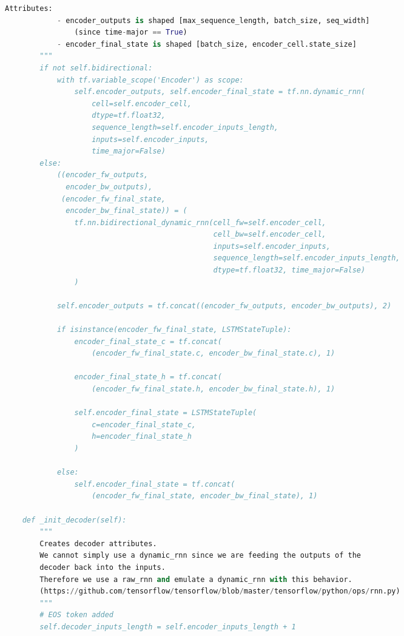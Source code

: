 \begin{landscape}
\begin{multicols}{2}
\begin{lstlisting}[language=Python]
        Attributes:
            - encoder_outputs is shaped [max_sequence_length, batch_size, seq_width]
                (since time-major == True)
            - encoder_final_state is shaped [batch_size, encoder_cell.state_size]
        """
        if not self.bidirectional:
            with tf.variable_scope('Encoder') as scope:
                self.encoder_outputs, self.encoder_final_state = tf.nn.dynamic_rnn(
                    cell=self.encoder_cell,
                    dtype=tf.float32,
                    sequence_length=self.encoder_inputs_length,
                    inputs=self.encoder_inputs,
                    time_major=False)
        else:
            ((encoder_fw_outputs,
              encoder_bw_outputs),
             (encoder_fw_final_state,
              encoder_bw_final_state)) = (
                tf.nn.bidirectional_dynamic_rnn(cell_fw=self.encoder_cell,
                                                cell_bw=self.encoder_cell,
                                                inputs=self.encoder_inputs,
                                                sequence_length=self.encoder_inputs_length,
                                                dtype=tf.float32, time_major=False)
                )

            self.encoder_outputs = tf.concat((encoder_fw_outputs, encoder_bw_outputs), 2)

            if isinstance(encoder_fw_final_state, LSTMStateTuple):
                encoder_final_state_c = tf.concat(
                    (encoder_fw_final_state.c, encoder_bw_final_state.c), 1)

                encoder_final_state_h = tf.concat(
                    (encoder_fw_final_state.h, encoder_bw_final_state.h), 1)

                self.encoder_final_state = LSTMStateTuple(
                    c=encoder_final_state_c,
                    h=encoder_final_state_h
                )

            else:
                self.encoder_final_state = tf.concat(
                    (encoder_fw_final_state, encoder_bw_final_state), 1)

    def _init_decoder(self):
        """
        Creates decoder attributes.
        We cannot simply use a dynamic_rnn since we are feeding the outputs of the
        decoder back into the inputs.
        Therefore we use a raw_rnn and emulate a dynamic_rnn with this behavior.
        (https://github.com/tensorflow/tensorflow/blob/master/tensorflow/python/ops/rnn.py)
        """
        # EOS token added
        self.decoder_inputs_length = self.encoder_inputs_length + 1


\end{lstlisting}
\end{multicols}
\end{landscape}
